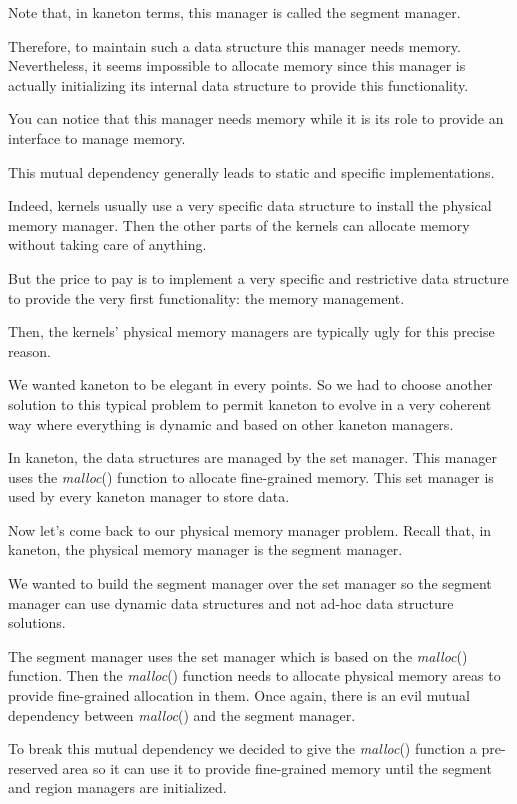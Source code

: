 Note that, in kaneton terms, this manager is called the segment manager.

Therefore, to maintain such a data structure this manager needs memory.
Nevertheless, it seems impossible to allocate memory since this manager
is actually initializing its internal data structure to provide this
functionality.

You can notice that this manager needs memory while it is its role to provide
an interface to manage memory.

This mutual dependency generally leads to static and specific implementations.

Indeed, kernels usually use a very specific data structure to install
the physical memory manager. Then the other parts of the kernels can allocate
memory without taking care of anything.

But the price to pay is to implement a very specific and restrictive
data structure to provide the very first functionality: the memory management.

Then, the kernels' physical memory managers are typically ugly for this
precise reason.

We wanted kaneton to be elegant in every points. So we had to choose another
solution to this typical problem to permit kaneton to evolve in a very
coherent way where everything is dynamic and based on other kaneton
managers.

In kaneton, the data structures are managed by the set manager. This
manager uses the \textit{malloc}() function to allocate fine-grained memory.
This set manager is used by every kaneton manager to store data.

Now let's come back to our physical memory manager problem. Recall that, in
kaneton, the physical memory manager is the segment manager.

We wanted to build the segment manager over the set manager so the segment
manager can use dynamic data structures and not ad-hoc data structure
solutions.

The segment manager uses the set manager which is based on the
\textit{malloc}() function. Then the \textit{malloc}() function needs to
allocate physical memory areas to provide fine-grained allocation in them.
Once again, there is an evil mutual dependency between \textit{malloc}()
and the segment manager.

To break this mutual dependency we decided to give the \textit{malloc}()
function a pre-reserved area so it can use it to provide fine-grained
memory until the segment and region managers are initialized.

